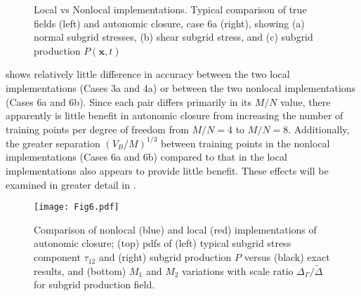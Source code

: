 %
\begin{figure}
	\centering %
	\label{F:CG24a}
\end{figure}
%
\begin{figure}
	\ContinuedFloat
	\centering %
	\label{F:CG24b}
\end{figure}
%
\begin{figure}
	\ContinuedFloat
	\centering %
	\label{F:CG24c}
\end{figure}
%
\begin{figure}
	\ContinuedFloat
	\caption{Local vs Nonlocal implementations. Typical comparison of  true fields (left) and autonomic closure, case 6a (right), showing (a) normal subgrid stresses, (b) shear subgrid stress, and (c) subgrid production $P(\mathbf{x},t)$}
	\label{F:CG24}
\end{figure}
%
%

 shows relatively little difference in accuracy between the two local implementations (Cases 3a and 4a) or between the two nonlocal implementations (Cases 6a and 6b). Since each pair differs primarily in its  $M/N$ value, there apparently is little benefit in autonomic closure from increasing the number of training points per degree of freedom from  $M/N = 4$ to  $M/N = 8$. Additionally, the greater separation  $(V_B/M)^{1/3}$ between training points in the nonlocal implementations (Cases 6a and 6b) compared to that in the local implementations also appears to provide little benefit. These effects will be examined in greater detail in .

%
\begin{figure}
	\centering \hspace{-1.0cm}
	\texttt{[image: Fig6.pdf]}
	\caption{ Comparison of nonlocal (blue) and local (red) implementations of autonomic closure; (top) pdfs of (left) typical subgrid stress component $\tau_{12}$ and (right) subgrid production $P$ versus (black) exact results, and (bottom) $M_1$ and $M_2$ variations with scale ratio $\Delta_{\Gamma}/\widetilde{\Delta}$ for subgrid production field. }
	\label{F:6}
\end{figure}
%
%


